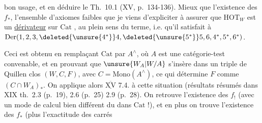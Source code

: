 bon usage, et en déduire le  Th.~10.1 (XV, p.~134-136). Mieux que l'existence des $f_*$, l'ensemble d'axiomes  faibles que je viens d'expliciter  à assurer que $\mathrm{HOT}_W$ est un \uline{dérivateur} sur $\mathrm{Cat}$  , au plein sens du terme, i.e. qu'il satisfait à $\mathrm{Der}(1,2,3,\deleted{\unsure{4^*}}4,\deleted{\unsure{5^*}}5,6,4^*,5^*,6^*)$.

Ceci est obtenu en remplaçant  $\mathrm{Cat}$ par $A^{\wedge}$, où $A$ est une catégorie-test convenable,  et en prouvant que   $\unsure{W_A|W/A}$ s'insère dans un triple de Quillen clos $(W,C,F)$, avec $C=\mathrm{Mono}(A^{\wedge})$, ce qui détermine $F$ comme $(C\cap W_A)_*$. On applique alors $\underline{\overline{\mathrm{XV}}}$ 7.4. à cette situation (résultats résumés dans XIX th.~2.3 (p.~19), 2.6 (p.~25) 2.9 (p.~28).
On retrouve l'existence des $f_!$ (avec un mode de calcul bien différent du  dans $\mathrm{Cat}$ !), et en plus on trouve l'existence des $f_*$ (plus l'exactitude des carrés
